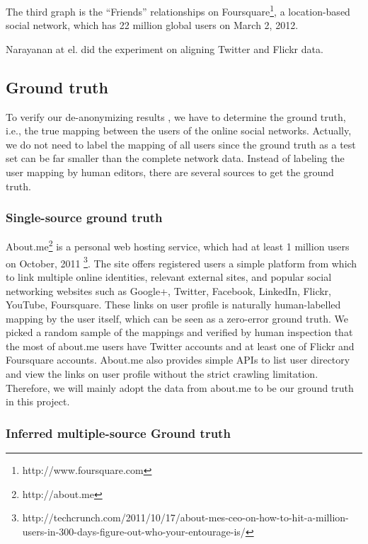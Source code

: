 \documentclass[11pt,letterpaper]{article}
\begin{document}
The third graph is the ``Friends'' relationships on Foursquare\footnote{http://www.foursquare.com}, a location-based social network, which has 22 million global users on March 2, 2012. 

Narayanan at el. \cite{Narayanan2008} did the experiment on aligning Twitter and Flickr data.

\subsection{Ground truth}
To verify our de-anonymizing results , we have to determine the ground truth, i.e., the true mapping between the users of the online social networks. Actually, we do not need to label the mapping of all users since the ground truth as a test set can be far smaller than the complete network data.
Instead of labeling the user mapping by human editors, there are several sources to get the ground truth. 

\subsubsection{Single-source ground truth}

About.me\footnote{http://about.me} is a personal web hosting service, which had at least 1 million users on October, 2011 \footnote{http://techcrunch.com/2011/10/17/about-mes-ceo-on-how-to-hit-a-million-users-in-300-days-figure-out-who-your-entourage-is/}. The site offers registered users a simple platform from which to link multiple online identities, relevant external sites, and popular social networking websites such as Google+, Twitter, Facebook, LinkedIn, Flickr, YouTube, Foursquare. These links on user profile is naturally human-labelled mapping by the user itself, which can be seen as a zero-error ground truth.  We picked a random sample of the mappings and verified by human inspection that the most of about.me users have Twitter accounts and at least one of Flickr and Foursquare accounts. About.me also provides simple APIs to list user directory and view the links on user profile without the strict crawling limitation. Therefore, we will mainly adopt the data from about.me to be our ground truth in this project.

\subsubsection{Inferred multiple-source Ground truth}
\end{document}
